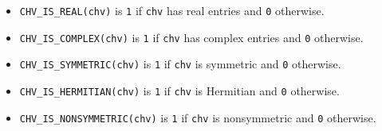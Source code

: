 \begin{itemize}
\item
{\tt CHV\_IS\_REAL(chv)} is {\tt 1} if {\tt chv} 
has real entries and {\tt 0} otherwise.
\item
{\tt CHV\_IS\_COMPLEX(chv)} is {\tt 1} if {\tt chv} 
has complex entries and {\tt 0} otherwise.
\item
{\tt CHV\_IS\_SYMMETRIC(chv)} is {\tt 1} if {\tt chv} 
is symmetric and {\tt 0} otherwise.
\item
{\tt CHV\_IS\_HERMITIAN(chv)} is {\tt 1} if {\tt chv} 
is Hermitian and {\tt 0} otherwise.
\item
{\tt CHV\_IS\_NONSYMMETRIC(chv)} is {\tt 1} if {\tt chv} 
is nonsymmetric and {\tt 0} otherwise.
\end{itemize}
